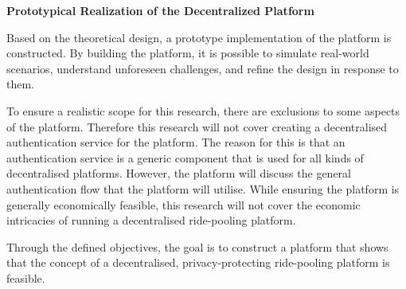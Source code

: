 \textbf{Prototypical Realization of the Decentralized Platform}

Based on the theoretical design, a prototype implementation of the platform is constructed. By building the platform,  it is possible to simulate real-world scenarios, understand unforeseen challenges, and refine the design in response to them.

To ensure a realistic scope for this research, there are exclusions to some aspects of the platform. Therefore this research will not cover creating a decentralised authentication service for the platform. The reason for this is that an authentication service is a generic component that is used for all kinds of decentralised platforms. However, the platform will discuss the general authentication flow that the platform will utilise. While ensuring the platform is generally economically feasible, this research will not cover the economic intricacies of running a decentralised ride-pooling platform.

 Through the defined objectives, the goal is to construct a platform that shows that the concept of a decentralised, privacy-protecting ride-pooling platform is feasible.